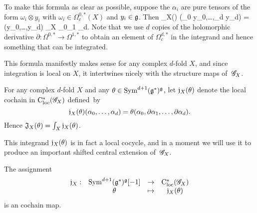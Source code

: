 To make this formula as clear as possible, suppose the $\alpha_i$ are pure tensors of the form $\omega_i \otimes y_i$ with $\omega_i \in \Omega^{0,*}_c(X)$ and $y_i \in \mathfrak g$.
Then
\beqn\label{jthetafactored}
\fJ_X(\theta) (\omega_0 \tensor y_0,\ldots,\omega_{d} \tensor y_{d}) = \theta(y_0,\ldots,y_{d}) \int_X \omega_0\wedge \partial \omega_1 \cdots \wedge \partial \omega_{d}.
\eeqn
Note that we use $d$ copies of the holomorphic derivative $\partial: \Omega^{0,*} \to \Omega^{1,*}$ to obtain an element of $\Omega^{d,*}_c$ in the integrand and hence something that can be integrated.

This formula manifestly makes sense for any complex $d$-fold $X$, 
and since integration is local on $X$, 
it intertwines nicely with the structure maps of~$\mathscr G_X$.

\begin{dfn}
For any complex $d$-fold $X$ and any $\theta \in {\rm Sym}^{d+1}(\mathfrak g^*)^\mathfrak g$, 
let $\mathfrak j_X(\theta)$ denote the local cochain in ${\rm C}_{\rm loc}^*(\mathscr G_X)$ defined~by
\[
\mathfrak j_X(\theta)(\alpha_0 ,\ldots,\alpha_d) = \theta(\alpha_0,\partial \alpha_1,\ldots,\partial \alpha_d).
\]
Hence $\mathfrak J_X(\theta) = \int_X \mathfrak j_X(\theta)$.
\end{dfn}

This integrand $\mathfrak j_X(\theta)$ is in fact a local cocycle, and 
in a moment we will use it to produce an important shifted central extension of~$\mathscr G_X$.

\begin{prop}\label{prop j map} 
The assignment 
\[
\begin{array}{cccc}
\mathfrak j_X : & {\rm Sym}^{d+1} (\mathfrak g^*)^\mathfrak g [-1]  & \to & {\rm C}_{\rm loc}^*(\mathscr G_X) \\ 
& \theta &\mapsto & \mathfrak j_X(\theta)
\end{array}
\]
is an cochain map.
\end{prop}


